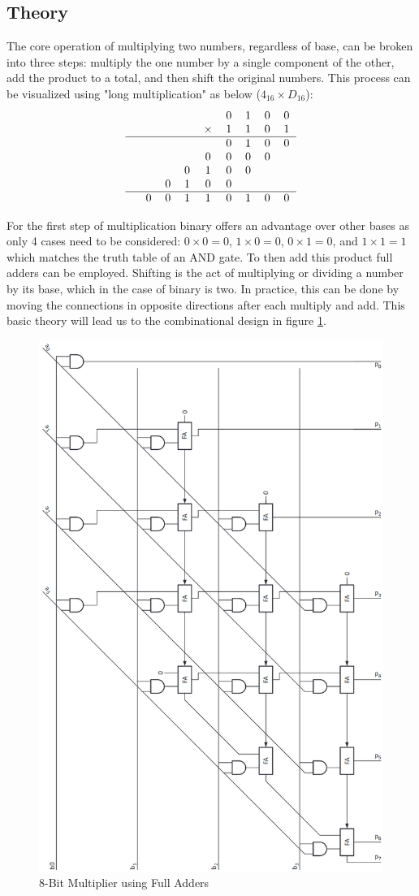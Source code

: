 \documentclass[11pt]{article}
\begin{document}
\subsection{Theory}
The core operation of multiplying two numbers, regardless of base, can be broken into three steps:
multiply the one number by a single component of the other, add the product to a total, and then shift the original numbers\cite{dally}.
This process can be visualized using "long multiplication" as below ($4_{16} \times D_{16}$):
\begin{equation}
    \begin{tabular}{c c c c c c c c c }
                &   &   &   &   & 0 & 1 & 0 & 0 \\
                &   &   &   &  $\times$ & 1 & 1 & 0 & 1 \\
                \hline
                &   &   &   &   & 0 & 1 & 0 & 0 \\
                &   &   &   & 0 & 0 & 0 & 0 &   \\
                &   &   & 0 & 1 & 0 & 0 &   &   \\
                &   & 0 & 1 & 0 & 0 &   &   &   \\
                \hline
                & 0 & 0 & 1 & 1 & 0 & 1 & 0 & 0 \\
    \end{tabular} 
\end{equation}

For the first step of multiplication binary offers an advantage over other bases as only 4 cases need to be considered: 
$0 \times 0 = 0$, $1 \times 0 = 0$, $0 \times 1 = 0$, and $1 \times 1 = 1$ which matches the truth table of an AND gate.
To then add this product full adders can be employed.
Shifting is the act of multiplying or dividing a number by its base, which in the case of binary is two.
In practice, this can be done by moving the connections in opposite directions after each multiply and add. 
This basic theory will lead us to the combinational design in figure \ref{fig:mult_fa}.

\begin{figure}[H]        
    \centering
    \includegraphics[width=.4\textwidth, origin=c, angle=270]{MultFA.png}
    \caption{8-Bit Multiplier using Full Adders \cite{dally}}
    \label{fig:mult_fa}
\end{figure} 
\end{document}
